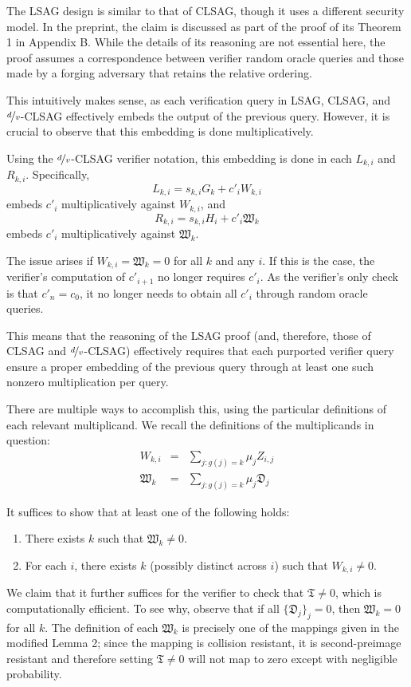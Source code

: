 \documentclass{article}
\begin{document}
The LSAG design is similar to that of CLSAG, though it uses a different security model.
In the preprint, the claim is discussed as part of the proof of its Theorem 1 in Appendix B.
While the details of its reasoning are not essential here, the proof assumes a correspondence between verifier random oracle queries and those made by a forging adversary that retains the relative ordering.

This intuitively makes sense, as each verification query in LSAG, CLSAG, and $\nicefrac{d}{v}$-CLSAG effectively embeds the output of the previous query.
However, it is crucial to observe that this embedding is done multiplicatively.

Using the $\nicefrac{d}{v}$-CLSAG verifier notation, this embedding is done in each $L_{k,i}$ and $R_{k,i}$.
Specifically, $$L_{k,i} = s_{k,i} G_k + c'_i W_{k,i}$$ embeds $c'_i$ multiplicatively against $W_{k,i}$, and $$R_{k,i} = s_{k,i} H_i + c'_i \mathfrak{W}_k$$ embeds $c'_i$ multiplicatively against $\mathfrak{W}_k$.

The issue arises if $W_{k,i} = \mathfrak{W}_k = 0$ for all $k$ and any $i$.
If this is the case, the verifier's computation of $c'_{i+1}$ no longer requires $c'_i$.
As the verifier's only check is that $c'_n = c_0$, it no longer needs to obtain all $c'_i$ through random oracle queries.

This means that the reasoning of the LSAG proof (and, therefore, those of CLSAG and $\nicefrac{d}{v}$-CLSAG) effectively requires that each purported verifier query ensure a proper embedding of the previous query through at least one such nonzero multiplication per query.

There are multiple ways to accomplish this, using the particular definitions of each relevant multiplicand.
We recall the definitions of the multiplicands in question:
\begin{eqnarray*}
	W_{k,i} &=& \sum_{j:g(j)=k} \mu_j Z_{i,j} \\
	\mathfrak{W}_k &=& \sum_{j:g(j)=k} \mu_j \mathfrak{D}_j
\end{eqnarray*}

It suffices to show that at least one of the following holds:
\begin{enumerate}
	\item There exists $k$ such that $\mathfrak{W}_k \neq 0$.
	\item For each $i$, there exists $k$ (possibly distinct across $i$) such that $W_{k,i} \neq 0$.
\end{enumerate}
We claim that it further suffices for the verifier to check that $\mathfrak{T} \neq 0$, which is computationally efficient.
To see why, observe that if all $\{\mathfrak{D}_j\}_j = 0$, then $\mathfrak{W}_k = 0$ for all $k$.
The definition of each $\mathfrak{W}_k$ is precisely one of the mappings given in the modified Lemma 2; since the mapping is collision resistant, it is second-preimage resistant and therefore setting $\mathfrak{T} \neq 0$ will not map to zero except with negligible probability.
\end{document}
